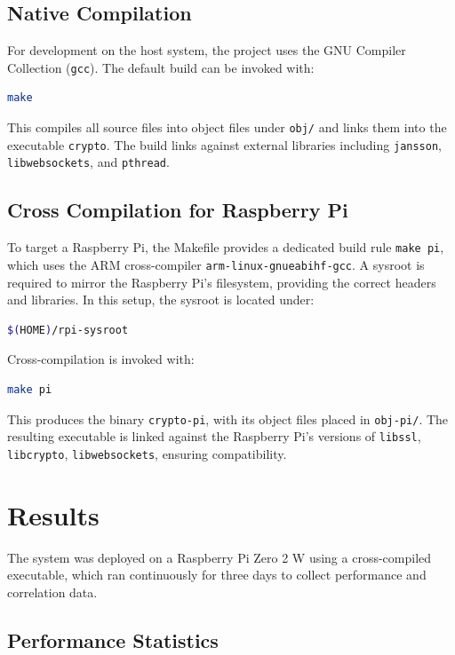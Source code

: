 \documentclass[11pt]{article}
\begin{document}
\subsection{Native Compilation}
For development on the host system, the project uses the GNU Compiler Collection (\texttt{gcc}). The default build can be invoked with:

\begin{lstlisting}[language=bash]
make
\end{lstlisting}

This compiles all source files into object files under \texttt{obj/} and links them into the executable \texttt{crypto}. The build links against external libraries including \texttt{jansson}, \texttt{libwebsockets}, and \texttt{pthread}.

\subsection{Cross Compilation for Raspberry Pi}
To target a Raspberry Pi, the Makefile provides a dedicated build rule \texttt{make pi}, which uses the ARM cross-compiler \texttt{arm-linux-gnueabihf-gcc}. A sysroot is required to mirror the Raspberry Pi’s filesystem, providing the correct headers and libraries. In this setup, the sysroot is located under:

\begin{lstlisting}[language=bash]
$(HOME)/rpi-sysroot
\end{lstlisting}

Cross-compilation is invoked with:

\begin{lstlisting}[language=bash]
make pi
\end{lstlisting}

This produces the binary \texttt{crypto-pi}, with its object files placed in \texttt{obj-pi/}. The resulting executable is linked against the Raspberry Pi’s versions of \texttt{libssl}, \texttt{libcrypto}, \texttt{libwebsockets}, ensuring compatibility.

\section{Results}

The system was deployed on a Raspberry Pi Zero 2 W using a cross-compiled executable, which ran continuously for three days to collect performance and correlation data.

\subsection{Performance Statistics}
\end{document}
